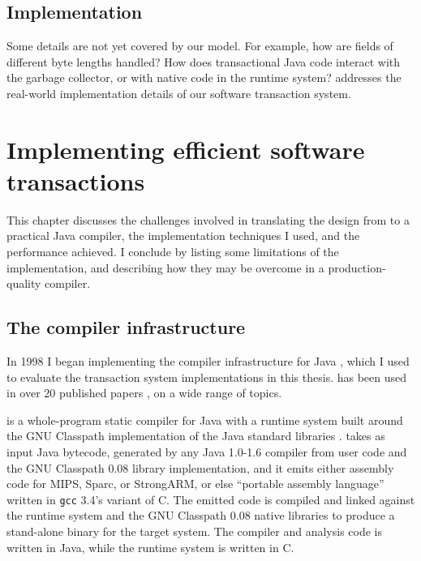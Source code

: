 \section*{Implementation}
Some details are not yet covered by our model.
For example, how are fields of different byte lengths handled?  How does
transactional Java code interact with the garbage collector, or with
native code in the runtime system?   addresses the
real-world
implementation details of our software transaction system.

\chapter{Implementing efficient software transactions}\label{cha:stmimpl}

This chapter discusses the challenges involved in translating the
design from  to a practical Java
compiler, the implementation techniques I used, and the performance
achieved.  I conclude by listing some limitations of the
implementation, and describing how they may be overcome in a
production-quality compiler.

\section{The \flex compiler infrastructure}
In 1998 I began implementing the \flex compiler infrastructure for
Java \cite{Flex}, which I used to evaluate the transaction system
implementations in this thesis.  \Flex has been used in over 20
published papers
\cite{DallmeierLiWaZe06,AnanianAsKuLeLi06,Ananian05,AnanianAsKuLeLi05,SalcianuRi05,RinardSaBu04,AnanianRi03,BoyapatiSaBeRi03,FeizabadiBeRaLiRi03,GheorghioiuSaRi03,ZeeRi02,WitchelCaAs02,Gheorghioiu02,Francu02,WitchelLaAnAs01,Whaley01,Salcianu01,BeebeeRi01,Beebee01,Klock01,SalcianuRi01,VivienRi01,Ananian99,WhaleyRi99},
on a wide range of topics.

\Flex is a whole-program static compiler for Java with a runtime
system built around the GNU Classpath implementation of the Java
standard libraries \cite{Classpath}.  \Flex takes as input Java
bytecode, generated by any Java 1.0-1.6 compiler from user code and
the GNU Classpath 0.08 library implementation, and it emits either
assembly code for MIPS, Sparc, or StrongARM, or else 
``portable assembly language'' written in \texttt{gcc} 3.4's variant
of C.  The emitted code is compiled and linked against the \flex runtime
system and the GNU Classpath 0.08 native libraries to produce a
stand-alone binary for the target system.  The \flex compiler and
analysis code is written in Java, while the \flex runtime system is
written in C.

